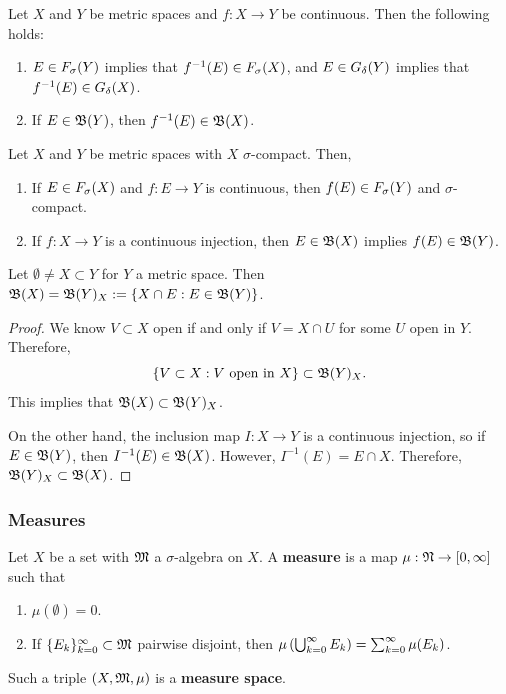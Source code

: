 \documentclass[a4paper]{article}
\begin{document}
\begin{thm}
  Let $X$ and $Y$ be metric spaces and $f: X \to Y$ be
  continuous. Then the following holds:
  \begin{enumerate}
    \item $E \in F_\sigma(Y)$ implies that $f^{-1}(E) \in F_\sigma(X)$,
    and $E \in G_\delta(Y)$ implies that $f^{-1}(E) \in G_\delta(X)$.

    \item If $E \in \mathfrak{B}(Y)$, then $f^{-1}(E) \in \mathfrak{B}(X)$.
  \end{enumerate}
\end{thm}

\begin{thm}
  Let $X$ and $Y$ be metric spaces with $X$ $\sigma$-compact.
  Then,
  \begin{enumerate}
    \item If $E \in F_\sigma(X)$ and $f : E \to Y$ is continuous,
    then $f(E) \in F_\sigma(Y)$ and $\sigma$-compact.

    \item If $f: X \to Y$ is a continuous injection,
    then $E \in \mathfrak{B}(X)$ implies $f(E) \in \mathfrak{B}(Y)$.
  \end{enumerate}
\end{thm}

\begin{cor}
  Let $\emptyset \neq X \subset Y$ for $Y$ a metric space.
  Then $\mathfrak{B}(X) = \mathfrak{B}(Y)_X := \left\{ X \cap E: E \in
  \mathfrak{B}(Y) \right\}$.
\end{cor}

\begin{proof}
  We know $V \subset X$ open if and only if $V = X \cap U$
  for some $U$ open in $Y$.
  Therefore,
  \[
    \left\{ V \subset X: \text{$V$ open in $X$}
    \right\} \subset \mathfrak{B}(Y)_X.
  \]
  This implies that $\mathfrak{B}(X) \subset \mathfrak{B}(Y)_X$.

  On the other hand, the inclusion map $I: X \to Y$ is
  a continuous injection, so if $E \in \mathfrak{B}(Y)$, then
  $I^{-1}(E) \in \mathfrak{B}(X)$. However, $I^{-1}(E) = E \cap X$.
  Therefore, $\mathfrak{B}(Y)_X \subset \mathfrak{B}(X)$.

\end{proof}

\subsubsection{Measures}

\begin{defi}[Measure]
  Let $X$ be a set with $\mathfrak{M}$ a $\sigma$-algebra on $X$.
  A \textbf{measure} is a map $\mu: \mathfrak{N} \to [0, \infty]$
  such that
  \begin{enumerate}
    \item $\mu(\emptyset) = 0$.
    \item If $\{ E_k \}_{k=0}^\infty \subset \mathfrak{M}$ pairwise disjoint,
    then $\mu \left( \bigcup_{k=0}^\infty E_k \right) = \sum_{k=0}^\infty \mu (E_k)$.
  \end{enumerate}
  Such a triple $(X, \mathfrak{M}, \mu)$ is a \textbf{measure
  space}.
\end{defi}
\end{document}
